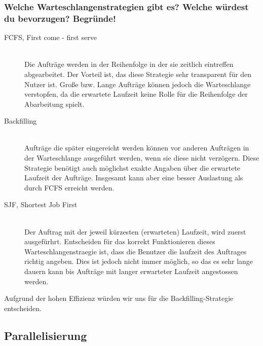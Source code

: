 	\subsubsection{Welche Warteschlangenstrategien gibt es? Welche w\"urdest du bevorzugen? Begr\"unde!}
	\begin{description}
		\item[FCFS, First come - first serve] \hfill \\
			Die Auftr\"age werden in der Reihenfolge in der sie zeitlich eintreffen abgearbeitet.
			Der Vorteil ist, das diese Strategie sehr transparent f\"ur den Nutzer ist.
			Große bzw. Lange Auftr\"age k\"onnen jedoch die Warteschlange verstopfen,
			da die erwartete Laufzeit keine Rolle f\"ur die Reihenfolge der Abarbeitung spielt.
		\item[Backfilling] \hfill \\
			Auftr\"age die sp\"ater eingereicht werden k\"onnen vor anderen Auftr\"agen in der
			Warteschlange ausgef\"uhrt werden, wenn sie diese nicht verz\"ogern.
			Diese Strategie ben\"otigt auch m\"oglichst exakte Angaben \"uber die erwartete Laufzeit
			der Auftr\"age.
			Insgesamt kann aber eine besser Auslastung als durch FCFS erreicht werden.	
		\item[SJF, Shortest Job First] \hfill \\
			Der Auftrag mit der jeweil k\"urzesten (erwarteten) Laufzeit, wird zuerst ausgef\"urhrt.
			Entscheiden f\"ur das korrekt Funktionieren dieses Warteschlangenstraegie ist,
			dass die Benutzer die laufzeit des Auftrages richtig angeben.
			Dies ist jedoch nicht immer m\"oglich,
			so das es sehr lange dauern kann bis Auftr\"age mit langer erwarteter Laufzeit angestossen werden.
	\end{description}
	Aufgrund der hohen Effizienz w\"urden wir uns für die Backfilling-Strategie entscheiden.
\subsection{Parallelisierung}
\small

\normalsize
